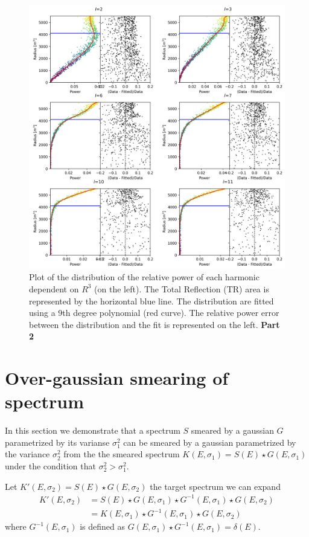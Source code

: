 \documentclass[../main.tex]{subfiles}
\begin{document}
\begin{figure}[ht]
  \centering
  \includegraphics[width=\linewidth]{images/jgnn/harmonic/power_fit_pt2.png}
  \caption{Plot of the distribution of the relative power of each harmonic dependent on $R^3$ (on the left). The Total Reflection (TR) area is represented by the horizontal blue line. The distribution are fitted using a 9th degree polynomial (red curve). The relative power error between the distribution and the fit is represented on the left. \textbf{Part 2}}
  \label{fig:annex:jgnn:harmonic:fit2}
\end{figure}

\chapter{Over-gaussian smearing of spectrum}
\label{sec:annex:oversmearing}

In this section we demonstrate that a spectrum $S$ smeared by a gaussian $G$ parametrized by its varianse $\sigma_1^2$ can be smeared by a gaussian parametrized by the variance $\sigma_2^2$ from the the smeared spectrum $K(E, \sigma_1) = S(E) \star G(E, \sigma_1)$ under the condition that $\sigma_2^2 > \sigma_1^2$.

Let $K'(E,\sigma_2) = S(E) \star G(E, \sigma_2)$ the target spectrum we can expand
\begin{align}
  K'(E, \sigma_2) &= S(E) \star G(E, \sigma_1) \star G^{-1}(E, \sigma_1) \star G(E, \sigma_2) \\
                  &= K(E, \sigma_1) \star G^{-1}(E, \sigma_1) \star G(E, \sigma_2)
\end{align}
where $G^{-1}(E, \sigma_1)$ is defined as $G(E, \sigma_1) \star G^{-1}(E, \sigma_1) = \delta(E)$.
\end{document}
